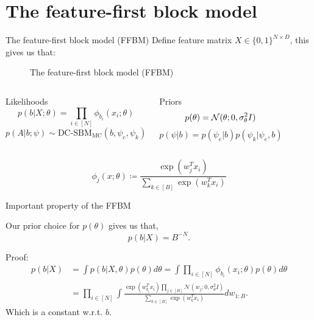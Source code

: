 \documentclass{beamer}
\newcommand{\Gaussian}{\mathcal{N}}
\begin{document}
\section{The feature-first block model}

	\begin{frame}{The feature-first block model (FFBM)}
		Define feature matrix $X \in \{0, 1\}^{N \times D}$, this gives us that:
		\begin{figure}[!h]
			\centering
			\caption{The feature-first block model (FFBM)}
			\label{fig:ffbm}
		\end{figure}
	
		\begin{columns}
			\begin{block}{Likelihoods}
				$$p(b|X; \theta) = \prod_{i \in [N]} \phi_{b_i} (x_i; \theta)$$
				$$p(A|b; \psi) \sim \textrm{DC-SBM}_{\textrm{MC}} (b, \psi_e, \psi_k)$$
			\end{block}
		
			\begin{block}{Priors}
				$$p(\theta) = \Gaussian(\theta;0, \sigma_\theta^2 I)\vspace{4mm}$$
				$$p(\psi | b) = p(\psi_e | b) p(\psi_k | \psi_e, b)$$
			\end{block}
		\end{columns}
	
		\vspace{5mm}
		$$\phi_{j}(x; \theta) \coloneqq \frac{\exp (w_j^T x_i)}{\sum_{k \in [B]} \exp (w_k^T x_i) }$$
	\end{frame}

	\begin{frame}{Important property of the FFBM}
		\begin{theorem}
			Our prior choice for $p(\theta)$ gives us that,
			$$p(b|X) = B^{-N}.$$
		\end{theorem}
		
		Proof:
		\begin{align*}
			p(b | X) &= \int p(b | X, \theta) p(\theta) d\theta = \int \prod_{i \in [N] } \phi_{b_i}(x_i; \theta) p(\theta) d\theta \\
			&= \prod_{i \in [N]} \int \frac{\exp(w_{b_i}^T x_i) \prod_{j \in [B]} \Gaussian(w_j; 0, \sigma_\theta^2 I)}{\sum_{k \in [B]} \exp(w_{k}^T x_i)} dw_{1:B}.
		\end{align*}
		Which is a constant w.r.t. $b$.
	\end{frame}
\end{document}
